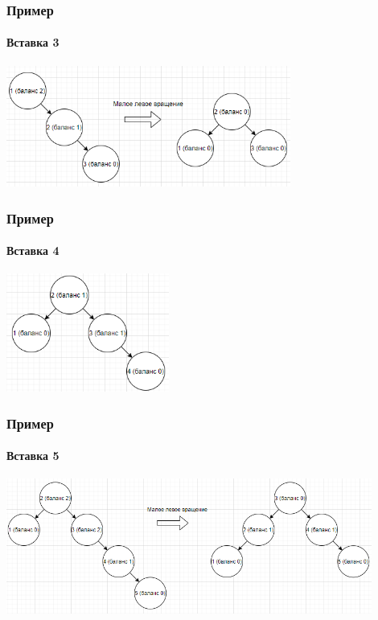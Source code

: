 \documentclass[xetex,mathserif,serif]{beamer}
\begin{document}
    \begin{frame}
        \frametitle{Пример}
        \framesubtitle{Вставка 3}
        \begin{center}
            \includegraphics[width=0.7\textwidth]{avl3.png}
        \end{center}
    \end{frame}

    \begin{frame}
        \frametitle{Пример}
        \framesubtitle{Вставка 4}
        \begin{center}
            \includegraphics[width=0.4\textwidth]{avl4.png}
        \end{center}
    \end{frame}

    \begin{frame}
        \frametitle{Пример}
        \framesubtitle{Вставка 5}
        \begin{center}
            \includegraphics[width=0.9\textwidth]{avl5.png}
        \end{center}
    \end{frame}
\end{document}
